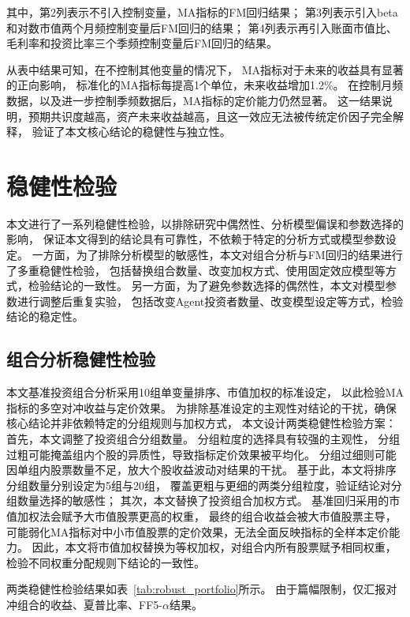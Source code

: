  \FloatBarrier

其中，第2列表示不引入控制变量，MA指标的FM回归结果；
第3列表示引入beta和对数市值两个月频控制变量后FM回归的结果；
第4列表示再引入账面市值比、毛利率和投资比率三个季频控制变量后FM回归的结果。

从表中结果可知，在不控制其他变量的情况下，
MA指标对于未来的收益具有显著的正向影响，
标准化的MA指标每提高1个单位，未来收益增加1.2\%。
在控制月频数据，以及进一步控制季频数据后，MA指标的定价能力仍然显著。
这一结果说明，预期共识度越高，资产未来收益越高，且这一效应无法被传统定价因子完全解释，
验证了本文核心结论的稳健性与独立性。

\section{稳健性检验}
本文进行了一系列稳健性检验，以排除研究中偶然性、分析模型偏误和参数选择的影响，
保证本文得到的结论具有可靠性，不依赖于特定的分析方式或模型参数设定。
一方面，为了排除分析模型的敏感性，本文对组合分析与FM回归的结果进行了多重稳健性检验，
包括替换组合数量、改变加权方式、使用固定效应模型等方式，检验结论的一致性。
另一方面，为了避免参数选择的偶然性，本文对模型参数进行调整后重复实验，
包括改变Agent投资者数量、改变模型设定等方式，检验结论的稳定性。

\subsection{组合分析稳健性检验}  
本文基准投资组合分析采用10组单变量排序、市值加权的标准设定，
以此检验MA指标的多空对冲收益与定价效果。
为排除基准设定的主观性对结论的干扰，确保核心结论并非依赖特定的分组规则与加权方式，
本文设计两类稳健性检验方案：
首先，本文调整了投资组合分组数量。
分组粒度的选择具有较强的主观性，
分组过粗可能掩盖组内个股的异质性，导致指标定价效果被平均化。
分组过细则可能因单组内股票数量不足，放大个股收益波动对结果的干扰。
基于此，本文将排序分组数量分别设定为5组与20组，
覆盖更粗与更细的两类分组粒度，验证结论对分组数量选择的敏感性；
其次，本文替换了投资组合加权方式。
基准回归采用的市值加权法会赋予大市值股票更高的权重，
最终的组合收益会被大市值股票主导，
可能弱化MA指标对中小市值股票的定价效果，无法全面反映指标的全样本定价能力。
因此，本文将市值加权替换为等权加权，对组合内所有股票赋予相同权重，
检验不同权重分配规则下结论的一致性。

两类稳健性检验结果如表~\ref{tab:robust_portfolio}所示。
由于篇幅限制，仅汇报对冲组合的收益、夏普比率、FF5-$\alpha$结果。

